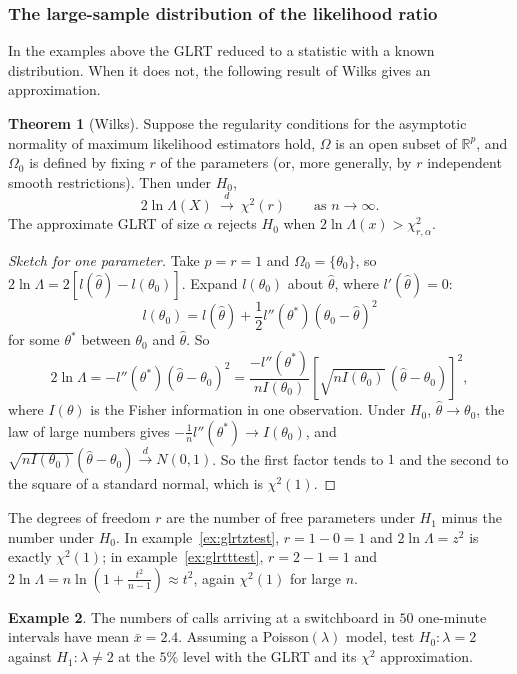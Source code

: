 \documentclass[12pt,a4paper]{report}
\theoremstyle{definition}
\newtheorem{thm}{Theorem}[section]
\newtheorem{example}[thm]{Example}
\theoremstyle{plain}
\begin{document}
\subsubsection{The large-sample distribution of the likelihood ratio}

In the examples above the GLRT reduced to a statistic with a known distribution.
When it does not, the following result of Wilks gives an approximation.

\begin{thm}[Wilks]
\label{thm:wilks}
Suppose the regularity conditions for the asymptotic normality of maximum
likelihood estimators hold, $\Omega$ is an open subset of $\mathbb{R}^p$, and
$\Omega_0$ is defined by fixing $r$ of the parameters (or, more generally, by $r$
independent smooth restrictions). Then under $H_0$,
\[2\ln\Lambda(X)\ \xrightarrow{d}\ \chi^2(r)\qquad\text{as } n\to\infty .\]
The approximate GLRT of size $\alpha$ rejects $H_0$ when
$2\ln\Lambda(x)>\chi^2_{r,\alpha}$.
\end{thm}

\begin{proof}[Sketch for one parameter]
Take $p = r = 1$ and $\Omega_0 = \{\theta_0\}$, so $2\ln\Lambda = 2\left[l(\hat\theta) -
l(\theta_0)\right]$. Expand $l(\theta_0)$ about $\hat\theta$, where $l'(\hat\theta) = 0$:
\[l(\theta_0) = l(\hat\theta) + \frac12 l''(\theta^*)(\theta_0 - \hat\theta)^2\]
for some $\theta^*$ between $\theta_0$ and $\hat\theta$. So
\[2\ln\Lambda = -l''(\theta^*)(\hat\theta - \theta_0)^2
= \frac{-l''(\theta^*)}{nI(\theta_0)}\left[\sqrt{nI(\theta_0)}\,(\hat\theta - \theta_0)\right]^2 ,\]
where $I(\theta)$ is the Fisher information in one observation. Under $H_0$,
$\hat\theta\to\theta_0$, the law of large numbers gives
$-\frac1n l''(\theta^*)\to I(\theta_0)$, and
$\sqrt{nI(\theta_0)}(\hat\theta - \theta_0)\xrightarrow{d}N(0,1)$. So the first
factor tends to $1$ and the second to the square of a standard normal, which is
$\chi^2(1)$.
\end{proof}

The degrees of freedom $r$ are the number of free parameters under $H_1$ minus the
number under $H_0$. In example~\ref{ex:glrtztest}, $r = 1 - 0 = 1$ and
$2\ln\Lambda = z^2$ is exactly $\chi^2(1)$; in example~\ref{ex:glrtttest}, $r = 2 -
1 = 1$ and $2\ln\Lambda = n\ln\left(1 + \frac{t^2}{n-1}\right)\approx t^2$, again
$\chi^2(1)$ for large $n$.

\begin{example}
\label{ex:wilkspoisson}
The numbers of calls arriving at a switchboard in $50$ one-minute intervals have
mean $\bar x = 2.4$. Assuming a Poisson$(\lambda)$ model, test
$H_0\colon\lambda = 2$ against $H_1\colon\lambda\ne2$ at the $5\%$ level with the
GLRT and its $\chi^2$ approximation.
\end{example}
\end{document}
